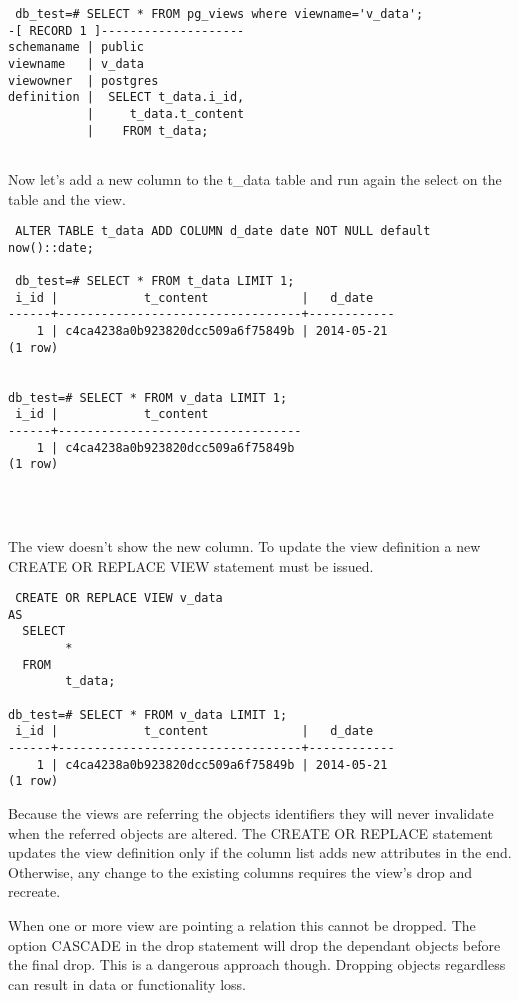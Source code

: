 \begin{verbatim}
 db_test=# SELECT * FROM pg_views where viewname='v_data';
-[ RECORD 1 ]--------------------
schemaname | public
viewname   | v_data
viewowner  | postgres
definition |  SELECT t_data.i_id,
           |     t_data.t_content
           |    FROM t_data;


\end{verbatim}

Now let's add a new column to the t\_data table and run again the select on the 
table and the view.

\begin{verbatim}
 ALTER TABLE t_data ADD COLUMN d_date date NOT NULL default now()::date;
 
 db_test=# SELECT * FROM t_data LIMIT 1;
 i_id |            t_content             |   d_date   
------+----------------------------------+------------
    1 | c4ca4238a0b923820dcc509a6f75849b | 2014-05-21
(1 row)


db_test=# SELECT * FROM v_data LIMIT 1;
 i_id |            t_content             
------+----------------------------------
    1 | c4ca4238a0b923820dcc509a6f75849b
(1 row)


 
\end{verbatim}

The view doesn't show the new column. To update the view definition a new 
CREATE OR REPLACE VIEW statement must be issued.

\begin{verbatim}
 CREATE OR REPLACE VIEW v_data 
AS 
  SELECT 
        *
  FROM 
        t_data;
        
db_test=# SELECT * FROM v_data LIMIT 1;
 i_id |            t_content             |   d_date   
------+----------------------------------+------------
    1 | c4ca4238a0b923820dcc509a6f75849b | 2014-05-21
(1 row)

\end{verbatim}

Because the views are referring the objects identifiers they will never 
invalidate when the referred objects are altered. 
The CREATE OR REPLACE statement updates the view definition only if the column 
list adds new attributes in the end. 
Otherwise, any change to the existing columns requires the view's drop and 
recreate. 

When one or more view are pointing a relation this cannot be dropped. 
The option CASCADE in the drop statement will drop the dependant objects before 
the final drop. This is a dangerous approach though. Dropping objects 
regardless can result in data or functionality loss.

